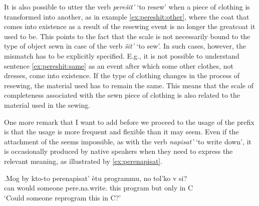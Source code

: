 It is also possible to utter the verb \textit{pere\v{s}it'} `to resew' when a piece of clothing is transformed into another, as in example \ref{ex:pereshit:other}, where the coat that comes into existence as a result of the resewing event is no longer the greatcoat it used to be. This points to the fact that the scale is not necessarily bound to the type of object sewn in case of the verb \textit{\v{s}it'} `to sew'. In such cases, however, the mismatch has to be explicitly specified. E.g., it is not possible to understand sentence \ref{ex:pereshit:same} as an event after which some other clothes, not dresses, come into existence.  If the type of clothing changes in the process of resewing, the material used has to remain the same. This means that the scale of completeness associated with the sewn piece of clothing is also related to the material used in the sewing.


One more remark that I want to add before we proceed to the  usage of the prefix  is that the  usage is more frequent and flexible than it may seem. Even if the attachment of the   seems impossible, as with the verb \textit{napisat'} `to write down', it is occasionally produced by native speakers when they need to express the relevant meaning, as illustrated by \ref{ex:perenapisat}. 

\exg.\label{ex:perenapisat}Mog by kto-to perenapisat' \`{e}tu programmu, no tol'ko v si?\\
can would someone pere.na.write. this program but only in C\\
\trans `Could someone reprogram this in C?'

